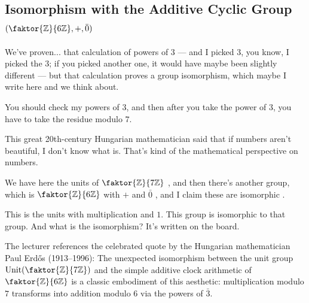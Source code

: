 \subsection{Isomorphism with the Additive Cyclic Group \texorpdfstring{$(\faktor{\mathbb{Z}}{6\mathbb{Z}}, +, \bar{0})$}{(Z/6Z, +, 0)}}

\begin{speech}[00:39:54 - 00:41:19]
We've proven... that calculation of powers of $3$ --- and I picked $3$, you know, I picked the $3$; if you picked another one, it would have maybe been slightly different --- but that calculation proves a group isomorphism, which maybe I write here and we think about. 

You should check my powers of $3$, and then after you take the power of $3$, you have to take the residue modulo $7$.

This great 20th-century Hungarian mathematician said that if numbers aren't beautiful, I don't know what is. That's kind of the mathematical perspective on numbers.

We have here the units of $\faktor{\mathbb{Z}}{7\mathbb{Z}}$ , and then there's another group, which is $\faktor{\mathbb{Z}}{6\mathbb{Z}}$ with $+$ and $\bar{0}$ , and I claim these are isomorphic .

This is the units with multiplication and $1$. This group is isomorphic to that group. And what is the isomorphism? It's written on the board.
\end{speech}

\begin{insight}
The lecturer references the celebrated quote by the Hungarian mathematician Paul Erd\H{o}s (1913--1996):  The unexpected isomorphism between the unit group $\operatorname{Unit}(\faktor{\mathbb{Z}}{7\mathbb{Z}})$ and the simple additive clock arithmetic of $\faktor{\mathbb{Z}}{6\mathbb{Z}}$ is a classic embodiment of this aesthetic: multiplication modulo $7$ transforms into addition modulo $6$ via the powers of $\bar{3}$.
\end{insight}

